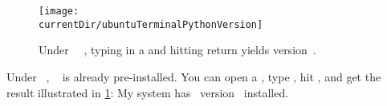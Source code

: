 %
%
\begin{figure}%
\centering%
\texttt{[image: \\currentDir/ubuntuTerminalPythonVersion]}%
\caption{Under \ubuntu\ \linux~, typing  in a  and hitting return yields version~.}%
\label{fig:ubuntuTerminalPythonVersion}%
\end{figure}%
%
\begin{sloppypar}%
Under \ubuntu\ \linux, \python~ is already pre-installed.
You can open a , type , hit \keys{\return}, and get the result illustrated in \cref{fig:ubuntuTerminalPythonVersion}:
My system has \python\ version~ installed.%
\end{sloppypar}%
%
\endhsection%
%
